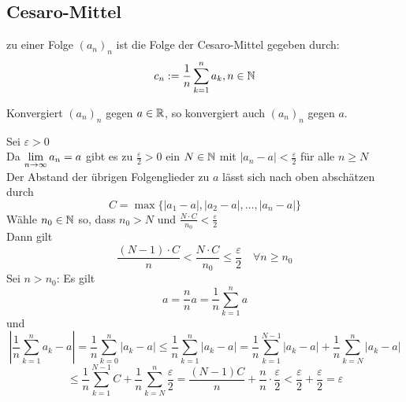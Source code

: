 \documentclass[../ana1u.tex]{subfiles}
\begin{document}
\subsection{Cesaro-Mittel}
zu einer Folge \((a_n)_n\) ist die Folge der Cesaro-Mittel gegeben durch:
\[c_n := \frac{1}{n} \sum_{k=1}^{n} a_k, n\in \mathbb{N}\]
\begin{beh}
    Konvergiert \((a_n)_n\) gegen \(a \in \mathbb{R}\), so konvergiert auch \((a_n)_n\) gegen \(a\).
\end{beh}
\begin{bew}
    Sei \(\varepsilon > 0\)\\
    Da \(\lim\limits_{n\rightarrow\infty} a_n = a\) gibt es zu \(\frac{\varepsilon}{2} > 0\) ein \(N \in \mathbb{N}\) mit \(|a_n -a| < \frac{\varepsilon}{2}\) für alle \(n \geq N\)\\
    Der Abstand der übrigen Folgenglieder zu \(a\) lässt sich nach oben abschätzen durch
    \[C = \max\{|a_1-a|,|a_2-a|, \dots, |a_n-a|\}\]
    Wähle \(n_0 \in \mathbb{N}\) so, dass \(n_0 > N\) und \(\frac{N \cdot C}{n_0} < \frac{\varepsilon}{2}\)\\
    Dann gilt
    \[\frac{(N-1) \cdot C}{n} < \frac{N \cdot C}{n_0} \leq \frac{\varepsilon}{2} \quad \forall n \geq n_0\]
    Sei \(n > n_0\): Es gilt
    \[a = \frac{n}{n}a = \frac{1}{n} \sum_{k=1}^{n} a\]
    und
    \[\left|\frac{1}{n} \sum_{k=1}^{n} a_k-a\right| = \frac{1}{n} \sum_{k=0}^{n} |a_k-a| \leq \frac{1}{n} \sum_{k=1}^{n} |a_k-a| = \frac{1}{n} \sum_{k=1}^{N-1} |a_k-a| + \frac{1}{n} \sum_{k=N}^{n} |a_k-a|\]
    \[\leq \frac{1}{n} \sum_{k=1}^{N-1} C + \frac{1}{n} \sum_{k=N}^{n} \frac{\varepsilon}{2} = \frac{(N-1)C}{n} + \frac{n}{n} \cdot \frac{\varepsilon}{2} < \frac{\varepsilon}{2} + \frac{\varepsilon}{2} = \varepsilon \]
\end{bew}
\end{document}

